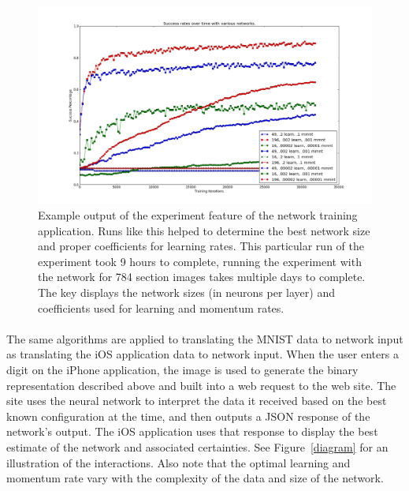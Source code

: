 \documentclass{article}
\begin{document}
    \begin{figure}
        \centering
        \includegraphics[scale=0.4]{images/experiment.png}
        \caption{Example output of the experiment feature of the network training
            application. Runs like this helped to determine the best network 
            size and proper coefficients for learning rates. This particular run
            of the experiment took 9 hours to complete, running the experiment
            with the network for 784 section images takes multiple days to 
            complete. The key displays the network sizes (in neurons per layer) 
            and coefficients used for learning and momentum rates.}
        \label{experiment}
    \end{figure}

    \paragraph{}The same algorithms are applied to translating the MNIST data
    to network input as translating the iOS application data to network input.
    When the user enters a digit on the iPhone application, the image is
    used to generate the binary representation described above and built into
    a web request to the web site. The site uses the neural network to interpret
    the data it received based on the best known configuration at the time, and
    then outputs a JSON response of the network's output. The iOS application
    uses that response to display the best estimate of the network and associated
    certainties. See Figure~\ref{diagram} for an illustration of the interactions.
    Also note that the optimal learning and momentum rate vary
    with the complexity of the data and size of the network.
\end{document}
